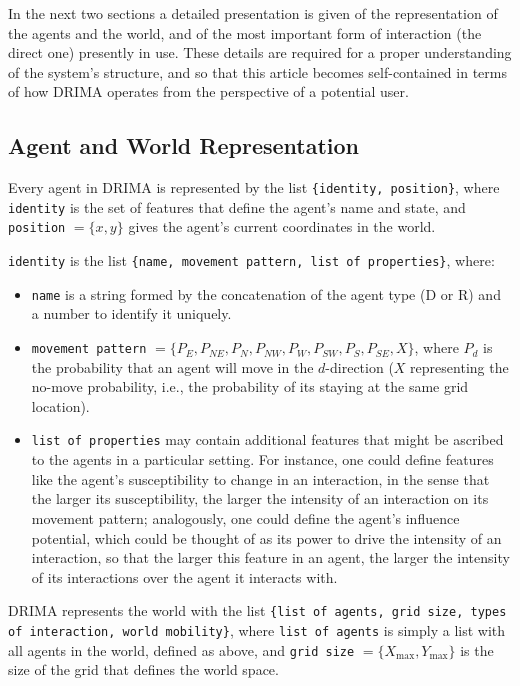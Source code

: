 \documentclass[11pt, a4paper]{article}
\begin{document}
In the next two sections a detailed presentation is given of the representation of the agents and the world, and of the most important form of interaction (the direct one) presently in use. These details are required for a proper understanding of the system's structure, and so that this article becomes self-contained in terms of how DRIMA operates from the perspective of a potential user.

\subsection{Agent and World Representation}

Every agent in DRIMA is represented by the list \texttt{\{identity, position\}}, where \texttt{identity} is the set of features that define the agent's name and state, and \texttt{position} $=\{x,y\}$ gives the agent's current coordinates in the world.

\texttt{identity} is the list \texttt{\{name, movement pattern, list of properties\}}, where:
\begin{itemize}
\item \texttt{name} is a string formed by the concatenation of the agent type (D or R) and a number to identify it uniquely.
\item \texttt{movement pattern} $=\{P_{E},P_{NE},P_{N},P_{NW},P_{W},P_{SW},P_{S},P_{SE},X\}$, where $P_{d}$ is the probability that an agent will move in the $d$-direction ($X$ representing the no-move probability, i.e., the probability of its staying at the same grid location).
\item \texttt{list of properties} may contain additional features that might be ascribed to the agents in a particular setting. For instance, one could define features like the agent's susceptibility to change in an interaction, in the sense that the larger its susceptibility, the larger the intensity of an interaction on its movement pattern; analogously, one could define the agent's influence potential, which could be thought of as its power to drive the intensity of an interaction, so that the larger this feature in an agent, the larger the intensity of its interactions over the agent it interacts with.
\end{itemize}

DRIMA represents the world with the list \texttt{\{list of agents, grid size, types of interaction, world mobility\}}, where \texttt{list of agents} is simply a list with all agents in the world, defined as above, and \texttt{grid size} $=\{X_{\max},Y_{\max}\}$ is the size of the grid that defines the world space.
\end{document}
